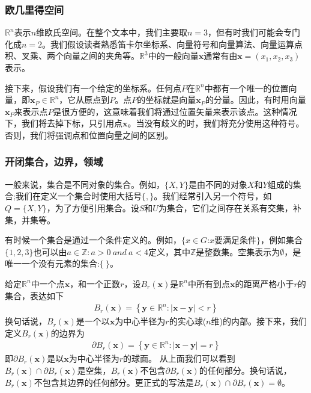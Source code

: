 \documentclass[12pt,a4paper]{article}
\numberwithin{equation}{section}
\begin{document}
\subsubsection{欧几里得空间}
$\mathbb{R}^n$表示$n$维欧氏空间。在整个文本中，我们主要取$n=3$，但有时我们可能会专门化成$n=2$。我们假设读者熟悉笛卡尔坐标系、向量符号和向量算法、向量运算点积、叉乘、两个向量之间的夹角等。$\mathbb{R}^3$中的一般向量$\mathbf{x}$通常有由$\mathbf{x}= (x_1, x_2, x_3)$表示。

接下来，假设我们有一个给定的坐标系。任何点$P$在$\mathbb{R}^n$中都有一个唯一的位置向量，即$\mathbf{x}_P\in \mathbb{R}^n$，它从原点到$P$。点$P$的坐标就是向量$\mathbf{x}_P$的分量。因此，有时用向量$\mathbf{x}_P$来表示点$P$是很方便的，这意味着我们将通过位置矢量来表示该点。这种情况下，我们将去掉下标，只引用点$\mathbf{x}$。当没有歧义的时，我们将充分使用这种符号。否则，我们将强调点和位置向量之间的区别。
\subsubsection{开闭集合，边界，领域}
一般来说，集合是不同对象的集合。例如，$\lbrace  X,Y \rbrace$是由不同的对象$X$和$Y$组成的集合;我们在定义一个集合时使用大括号$\lbrace  , \rbrace$。我们经常引入另一个符号，如$Q=\lbrace X , Y \rbrace$，为了方便引用集合。设$S$和$U$为集合，它们之间存在关系有交集，补集，并集等。

有时候一个集合是通过一个条件定义的。例如，$ \lbrace x\in G$:$x$要满足条件$\rbrace$，例如集合$\lbrace 1,2,3\rbrace$也可以由$a \in \mathbb{Z}:a>0~and~a<4$定义，其中$\mathbb{Z}$是整数集。空集表示为$\emptyset $，是唯一一个没有元素的集合:$\lbrace  ~ \rbrace$。

给定$\mathbb{R}^n$中一个点$\mathbf{x}$，和一个正数$r$，设$B_r(\mathbf{x})$是$\mathbb{R}^n$中所有到点$\mathbf{x}$的距离严格小于$r$的集合，表达如下
\begin{gather}
B_r(\mathbf{x})=\left\{ \mathbf{y} \in \mathbb{R}^n:\left| \mathbf{x} - \mathbf{y} \right| <r \right\}
\end{gather}
换句话说，$B_r(\mathbf{x})$是一个以$\mathbf{x}$为中心半径为$r$的实心球($n$维)的内部。接下来，我们定义$B_r(\mathbf{x})$的边界为
\begin{gather}
\partial B_r(\mathbf{x})=\left\{ \mathbf{y} \in \mathbb{R}^n:\left| \mathbf{x} - \mathbf{y} \right|=r  \right\}
\end{gather}
即$\partial B_r(\mathbf{x})$是以$\mathbf{x}$为中心半径为$r$的球面。
从上面我们可以看到$B_r(\mathbf{x}) \cap \partial B_r(\mathbf{x})$是空集，$B_r(\mathbf{x})$不包含$\partial B_r(\mathbf{x})$的任何部分。换句话说，$B_r(\mathbf{x})$不包含其边界的任何部分。更正式的写法是$B_r(\mathbf{x}) \cap \partial B_r(\mathbf{x})=\emptyset$。
\end{document}
